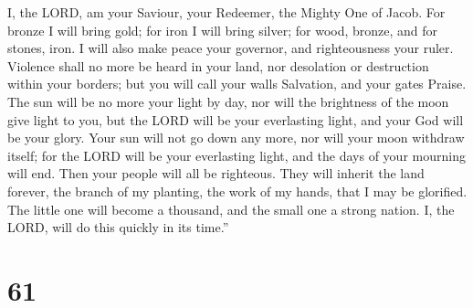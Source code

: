 I, the LORD, am your Saviour, your Redeemer, the Mighty One of Jacob.
 For bronze I will bring gold; for iron I will bring
silver; for wood, bronze, and for stones, iron. I will also make peace
your governor, and righteousness your ruler.  Violence
shall no more be heard in your land, nor desolation or destruction
within your borders; but you will call your walls Salvation, and your
gates Praise.  The sun will be no more your light by day,
nor will the brightness of the moon give light to you, but the LORD will
be your everlasting light, and your God will be your glory.
 Your sun will not go down any more, nor will your moon
withdraw itself; for the LORD will be your everlasting light, and the
days of your mourning will end.  Then your people will all
be righteous. They will inherit the land forever, the branch of my
planting, the work of my hands, that I may be glorified. 
The little one will become a thousand, and the small one a strong
nation. I, the LORD, will do this quickly in its time.''

\hypertarget{section-57}{%
\section{61}\label{section-57}}


